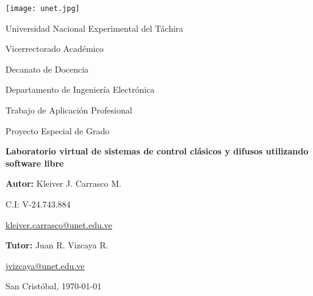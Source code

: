 \begin{titlepage}
\begin{center}
	\texttt{[image: unet.jpg]}
	
	Universidad Nacional Experimental del Táchira 
	
	Vicerrectorado Académico
	
	Decanato de Docencia
	
	Departamento de Ingeniería Electrónica
	
	Trabajo de Aplicación Profesional
	
	Proyecto Especial de Grado
\end{center}

\centering
	\vspace{2.5cm}
	\vfill
	{\Large \textbf{Laboratorio virtual de sistemas de control clásicos y difusos utilizando software libre}\par}

\vfill
\begin{flushright}
	\begin{spacing}{1.5}
		\textbf{Autor:} Kleiver J. Carrasco M.
		
		C.I: V-24.743.884
		
		\href{kleiver.carrasco@unet.edu.ve}{kleiver.carrasco@unet.edu.ve}
		
		\textbf{Tutor:} Juan R. Vizcaya R.
		
		\href{jvizcaya@unet.edu.ve}{jvizcaya@unet.edu.ve}
	\end{spacing}	
\end{flushright}

\vfill
	San Cristóbal, \monthyeardate\today
\leavevmode
\end{titlepage}
